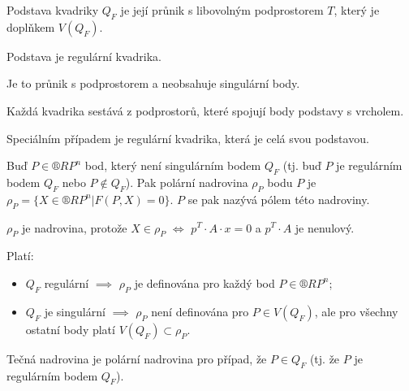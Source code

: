 \documentclass[12pt]{article}					%
\begin{document}
\begin{definice}
	Podstava kvadriky $Q_F$ je její průnik s libovolným podprostorem $T$, který je doplňkem $V(Q_F)$.
\end{definice}

\begin{dusledek}
	Podstava je regulární kvadrika.

	\begin{dukazin}
		Je to průnik s podprostorem a neobsahuje singulární body.
	\end{dukazin}
\end{dusledek}

\begin{dusledek}
	Každá kvadrika sestává z podprostorů, které spojují body podstavy s vrcholem.

	\begin{poznamkain}
		Speciálním případem je regulární kvadrika, která je celá svou podstavou.
	\end{poznamkain}
\end{dusledek}

\begin{definice}
	Buď $P \in ®RP^n$ bod, který není singulárním bodem $Q_F$ (tj. buď $P$ je regulárním bodem $Q_F$ nebo $P \notin Q_F$). Pak polární nadrovina $ρ_P$ bodu $P$ je $ρ_P = \{X \in ®RP^n | F(P, X) = 0\}$. $P$ se pak nazývá pólem této nadroviny.

	\begin{poznamkain}
		$ρ_P$ je nadrovina, protože $X \in ρ_P$ $\Leftrightarrow$ $p^T·A·x = 0$ a $p^T·A$ je nenulový.
	\end{poznamkain}
\end{definice}

\begin{poznamka}
	Platí:

	\begin{itemize}
		\item $Q_F$ regulární $\implies$ $ρ_P$ je definována pro každý bod $P \in ®RP^n$;
		\item $Q_F$ je singulární $\implies$ $ρ_P$ není definována pro $P \in V(Q_F)$, ale pro všechny ostatní body platí $V(Q_F) \subset ρ_P$.
	\end{itemize}
\end{poznamka}

\begin{definice}
	Tečná nadrovina je polární nadrovina pro případ, že $P \in Q_F$ (tj. že $P$ je regulárním bodem $Q_F$).
\end{definice}
\end{document}
